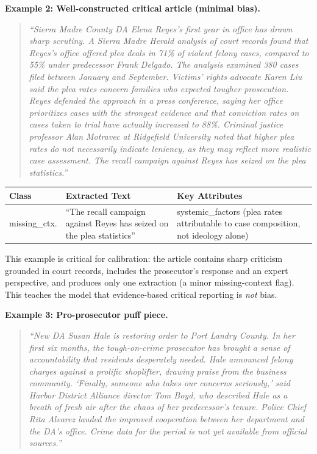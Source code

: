 \documentclass[12pt, letterpaper]{article}
\begin{document}
\begin{appendices}
\noindent\textbf{Example 2: Well-constructed critical article (minimal bias).}
\begin{quote}\small
\emph{``Sierra Madre County DA Elena Reyes's first year in office has drawn sharp scrutiny. A Sierra Madre Herald analysis of court records found that Reyes's office offered plea deals in 71\% of violent felony cases, compared to 55\% under predecessor Frank Delgado. The analysis examined 380 cases filed between January and September. Victims' rights advocate Karen Liu said the plea rates concern families who expected tougher prosecution. Reyes defended the approach in a press conference, saying her office prioritizes cases with the strongest evidence and that conviction rates on cases taken to trial have actually increased to 88\%. Criminal justice professor Alan Motravec at Ridgefield University noted that higher plea rates do not necessarily indicate leniency, as they may reflect more realistic case assessment. The recall campaign against Reyes has seized on the plea statistics.''}
\end{quote}

\begin{table}[H]
\centering\small
\begin{tabular}{p{2.5cm}p{5.8cm}p{5cm}}
\toprule
Class & Extracted Text & Key Attributes \\
\midrule
missing\_ctx. & ``The recall campaign against Reyes has seized on the plea statistics'' & systemic\_factors (plea rates attributable to case composition, not ideology alone) \\
\bottomrule
\end{tabular}
\end{table}

\noindent This example is critical for calibration: the article contains sharp criticism grounded in court records, includes the prosecutor's response and an expert perspective, and produces only one extraction (a minor missing-context flag). This teaches the model that evidence-based critical reporting is \emph{not} bias.

\smallskip\noindent\textbf{Example 3: Pro-prosecutor puff piece.}
\begin{quote}\small
\emph{``New DA Susan Hale is restoring order to Port Landry County. In her first six months, the tough-on-crime prosecutor has brought a sense of accountability that residents desperately needed. Hale announced felony charges against a prolific shoplifter, drawing praise from the business community. `Finally, someone who takes our concerns seriously,' said Harbor District Alliance director Tom Boyd, who described Hale as a breath of fresh air after the chaos of her predecessor's tenure. Police Chief Rita Alvarez lauded the improved cooperation between her department and the DA's office. Crime data for the period is not yet available from official sources.''}
\end{quote}


\end{appendices}
\end{document}
